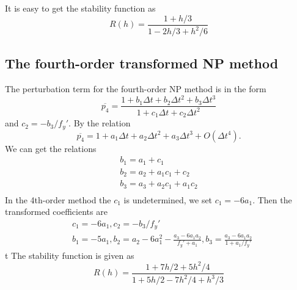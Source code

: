 \documentclass[review]{elsarticle}
\theoremstyle{plain}\newtheorem{definition}{\sc{Definition}}
\theoremstyle{defination}\newtheorem{example}{Example}[section]
\numberwithin{equation}{section}
\numberwithin{table}{section}
\begin{document}
{It is easy to get the stability function as 
\begin{equation}
  R(h) = \frac{1+h/3}{1-2h/3+h^2/6}
\end{equation}

\subsection{The fourth-order transformed NP method}
The perturbation term for  the fourth-order NP method is in the  form 
\begin{equation}
  \overline{p_4} = \frac{1+b_1 \Delta t + b_2 \Delta t^2 +b_3\Delta t^3}{1+c_1 \Delta t +c_2 \Delta t^2}
  \end{equation}
  and 
$	c_2= -b_3/f_y'$.
By  the relation 
\begin{equation}
  \overline{p_4}= 1+a_1 \Delta t + a_2\Delta t^2 +a_3\Delta t^3 +O(\Delta t^4).
  \end{equation}
We can get the relations
\begin{equation}
  \begin{aligned}
  b_1= a_1+ c_1\\
  b_2= a_2+a_1c_1 +c_2\\
  b_3= a_3+a_2c_1+a_1c_2\\
  \end{aligned}
  \end{equation}
 In  the 4th-order method the $c_1$ is undetermined, we set  $c_1 = -6a_1$.  Then the transformed coefficients are
 \begin{equation}
   \begin{aligned}
   &c_1=-6a_1,c_2=-b_3/f_y'\\
   &b_1=-5a_1, b_2=a_2-6a_1^2-\frac{a_3-6a_1a_2}{f_y'+a_1}, b_3=\frac{a_3-6a_1a_2}{1+a_1/f_y'}
   \end{aligned}
   \end{equation}
t 
 The stability function is given as 
  \begin{equation}
	R(h)=\frac{1+7h/2+5h^2/4}{1+5h/2-7h^2/4+h^3/3}
	\end{equation}
}
\end{document}

